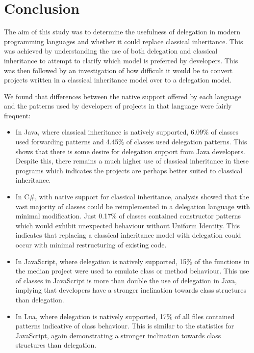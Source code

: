 \chapter{Conclusion}\label{C:con}
The aim of this study was to determine the usefulness of delegation in modern programming languages and whether it could replace classical inheritance. This was achieved by understanding the use of both delegation and classical inheritance to attempt to clarify which model is preferred by developers. This was then followed by an investigation of how difficult it would be to convert projects written in a classical inheritance model over to a delegation model.
\newline

We found that differences between the native support offered by each language and the patterns used by developers of projects in that language were fairly frequent:
\begin{itemize}
	\item In Java, where classical inheritance is natively supported, 6.09\% of classes used forwarding patterns and 4.45\% of classes used delegation patterns. This shows that there is some desire for delegation support from Java developers. Despite this, there remains a much higher use of classical inheritance in these programs which indicates the projects are perhaps better suited to classical inheritance.
	
	\item In C\#, with native support for classical inheritance, analysis showed that the vast majority of classes could be reimplemented in a delegation language with minimal modification. Just 0.17\% of classes contained constructor patterns which would exhibit unexpected behaviour without Uniform Identity. This indicates that replacing a classical inheritance model with delegation could occur with minimal restructuring of existing code.
	
	\item In JavaScript, where delegation is natively supported, 15\% of the functions in the median project were used to emulate class or method behaviour. This use of classes in JavaScript is more than double the use of delegation in Java, implying that developers have a stronger inclination towards class structures than delegation.
	
	\item In Lua, where delegation is natively supported, 17\% of all files contained patterns indicative of class behaviour. This is similar to the statistics for JavaScript, again demonstrating a stronger inclination towards class structures than delegation.
\end{itemize}

